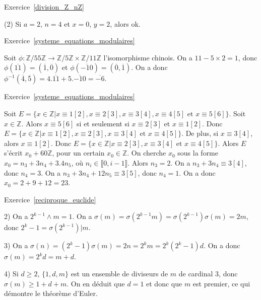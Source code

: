 \documentclass[11pt,a4paper]{article}
\newcommand{\Z}{\mathbb{Z}}
\begin{document}
Exercice~\ref{division_Z_nZ}

(2) Si $a=2$, $n=4$ et $x=0$, $y=2$, alors ok.

Exercice~\ref{systeme_equations_modulaires}

Soit $\phi:\Z/55\Z\rightarrow \Z/5\Z\times \Z/11\Z$ l'isomorphisme chinois. On a $11-5\times 2=1$, donc $\phi(\overline{11})=(\overline{1},\overline{0})$ et $\phi(\overline{-10})=(\overline{0},\overline{1})$. On a donc $\phi^{-1}(\overline{4},\overline{5})=4.\overline{11}+5.\overline{-10}=\overline{-6}$.


Exercice~\ref{systeme_equations_modulaires}

Soit $E=\{x\in \Z|x\equiv1 [2], x\equiv 2[3], x\equiv 3[4], x\equiv 4[5]\text{ et }x\equiv 5[6]\}$. Soit $x\in \Z$. Alors $x\equiv 5[6]$ si et seulement si $x\equiv 2[3]$ et $x\equiv 1[2]$. Donc $E=\{x\in \Z|x\equiv1 [2], x\equiv 2[3], x\equiv 3[4]\text{ et } x\equiv 4[5]\}$. De plus, si $x\equiv 3[4]$, alors $x\equiv 1[2]$. Donc $E=\{x\in \Z| x\equiv 2[3], x\equiv 3[4] \text{ et }x\equiv 4[5]\}$. Alors $E$ s'écrit $x_0+60\Z$, pour un certain $x_0\in \Z$. On cherche $x_0$ sous la forme $x_0=n_3+3 n_4+3.4 n_5$, où $n_i\in \llbracket 0,i-1\rrbracket$. Alors $n_3=2$. On a $n_3+3n_4\equiv 3[4]$, donc $n_4=3$. On a $n_3+3n_4+12 n_5\equiv 3[5]$, donc $n_4=1$. On a donc $x_0=2+9+12=23$.

Exercice~\ref{reciproque_euclide}



2) On a  $2^{k-1}\wedge m =1$. On a $\sigma(m)=\sigma(2^{k-1}m)=\sigma(2^{k-1})\sigma(m)=2m$, donc $2^k-1=\sigma(2^{k-1}) | m$. 

3) On a $\sigma(n)=(2^k-1)\sigma(m)=2n=2^km=2^k(2^k-1)d$. On a donc $\sigma(m)=2^kd=m+d$. 

4) Si $d\geq 2$, $\{1,d,m\}$ est un ensemble de diviseurs de $m$ de cardinal $3$, donc $\sigma(m)\geq 1+d+m$. On en déduit que $d=1$ et donc que $m$ est premier, ce qui démontre le théorème d'Euler.
\end{document}
